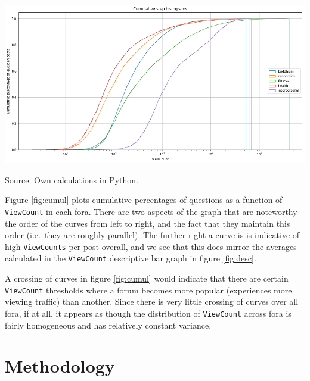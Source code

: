 \documentclass[11pt,preprint, authoryear]{article}
\let\origfigure\figure
\let\endorigfigure\endfigure
\renewenvironment{figure}[1][2] {
    \expandafter\origfigure\expandafter[H]
} {
    \endorigfigure
}
\numberwithin{equation}{section}
\numberwithin{figure}{section}
\numberwithin{table}{section}
\begin{document}
\normalsize

\begin{figure}
\caption{\textbf{Cumulative Graph for Question Viewcounts}}
\label{fig:cumul}

\begin{center}\includegraphics[width=1\linewidth]{../../01-python-code/00-workspace/01-graphs/cumul-viewcount} \end{center}
\centering
{\footnotesize Source: Own calculations in Python.}
\end{figure}

\normalsize

Figure \ref{fig:cumul} plots cumulative percentages of questions as a
function of \texttt{ViewCount} in each fora. There are two aspects of
the graph that are noteworthy - the order of the curves from left to
right, and the fact that they maintain this order (i.e.~they are roughly
parallel). The further right a curve is is indicative of high
\texttt{ViewCounts} per post overall, and we see that this does mirror
the averages calculated in the \texttt{ViewCount} descriptive bar graph
in figure \ref{fig:desc}.

A crossing of curves in figure \ref{fig:cumul} would indicate that there
are certain \texttt{ViewCount} thresholds where a forum becomes more
popular (experiences more viewing traffic) than another. Since there is
very little crossing of curves over all fora, if at all, it appears as
though the distribution of \texttt{ViewCount} across fora is fairly
homogeneous and has relatively constant variance.

\color{black}

\newpage

\section{\texorpdfstring{Methodology
\label{Meth}}{Methodology }}\label{methodology}
\end{document}

